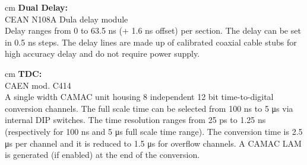 	 cm
	\textbf{Dual Delay:} \\CEAN N108A Dula delay module\\
	Delay ranges from 0 to 63.5 ns (+ 1.6 ns offset) per section. The delay can be set in 0.5 ns steps. The delay lines are made up of calibrated coaxial cable stubs for high accuracy delay and do not require power supply.
	
	 cm
	\textbf{TDC:} \\CAEN mod. C414\\
	A single width CAMAC unit housing 8 independent 12 bit time-to-digital conversion channels. The full scale time can be selected from 100 ns to 5 μs via internal DIP switches. The time resolution ranges from 25 ps to 1.25 ns (respectively for 100 ns and 5 μs full scale time range). The conversion time is 2.5 μs per channel and it is reduced to 1.5 μs for overflow channels. A CAMAC LAM is generated (if enabled) at the end of the conversion.
